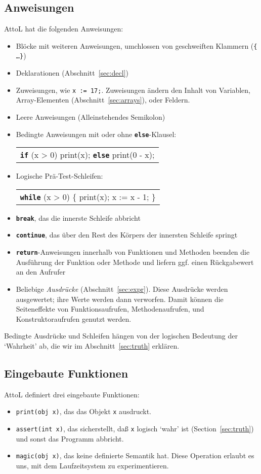 \documentclass[11pt,a4paper]{article}
\newenvironment{slisting}{%
        \begin{tt}%
        \begin{tabular}{l}%
        }
        {%
        \end{tabular}%
        \end{tt}%
        }
\newcommand{\Cty}[1]{\textcolor{dblue}{\texttt{#1}}}
\newcommand{\Ckw}[1]{\textbf{\texttt{#1}}}
\begin{document}
\subsection{Anweisungen}
AttoL hat die folgenden Anweisungen:
\begin{itemize}
\item Blöcke mit weiteren Anweisungen, umchlossen von geschweiften Klammern (\texttt{\{ \ldots \}})
\item Deklarationen (Abschnitt~\ref{sec:decl})
\item Zuweisungen, wie \texttt{x := 17;}.  Zuweisungen ändern den Inhalt von Variablen,
  Array-Elementen (Abschnitt~\ref{sec:arrays}), oder Feldern.
\item Leere Anweisungen (Alleinstehendes Semikolon)
\item Bedingte Anweisungen mit oder ohne \Ckw{else}-Klausel:
  \begin{slisting}
    \Ckw{if} (x > 0) print(x); \Ckw{else} print(0 - x);\\
  \end{slisting}
\item Logische Prä-Test-Schleifen:
    \begin{slisting}
      \Ckw{while} (x > 0) \{ print(x); x := x - 1; \}
    \end{slisting}
\item \Ckw{break}, das die innerste Schleife abbricht
\item \Ckw{continue}, das über den Rest des Körpers der innersten Schleife springt
\item \Ckw{return}-Anweisungen innerhalb von Funktionen und Methoden beenden die Ausführung der Funktion oder Methode
  und liefern ggf. einen Rückgabewert an den Aufrufer
\item Beliebige \emph{Ausdrücke} (Abschnitt~\ref{sec:expr}).  Diese Ausdrücke werden ausgewertet;
  ihre Werte werden dann verworfen.  Damit können die Seiteneffekte von Funktionsaufrufen, Methodenaufrufen, und
  Konstruktoraufrufen genutzt werden.
\end{itemize}
Bedingte Ausdrücke und Schleifen hängen von der logischen Bedeutung der `Wahrheit' ab, die wir im Abschnitt~\ref{sec:truth}
erklären.

\subsection{Eingebaute Funktionen}
AttoL definiert drei eingebaute Funktionen:
\begin{itemize}
\item \texttt{print(\Cty{obj} x)}, das das Objekt \texttt{x} ausdruckt.
\item \texttt{assert(\Cty{int} x)}, das sicherstellt, daß \texttt{x} logisch `wahr' ist (Section~\ref{sec:truth})  und sonst das Programm abbricht.
\item \texttt{magic(\Cty{obj} x)}, das keine definierte Semantik hat.  Diese Operation erlaubt es uns, mit dem Laufzeitsystem zu experimentieren.
\end{itemize}
\end{document}
